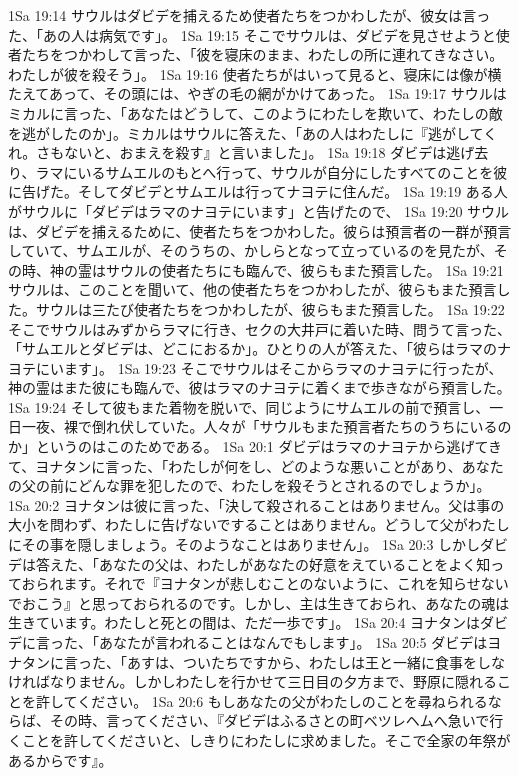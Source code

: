 1Sa 19:14  サウルはダビデを捕えるため使者たちをつかわしたが、彼女は言った、「あの人は病気です」。
1Sa 19:15  そこでサウルは、ダビデを見させようと使者たちをつかわして言った、「彼を寝床のまま、わたしの所に連れてきなさい。わたしが彼を殺そう」。
1Sa 19:16  使者たちがはいって見ると、寝床には像が横たえてあって、その頭には、やぎの毛の網がかけてあった。
1Sa 19:17  サウルはミカルに言った、「あなたはどうして、このようにわたしを欺いて、わたしの敵を逃がしたのか」。ミカルはサウルに答えた、「あの人はわたしに『逃がしてくれ。さもないと、おまえを殺す』と言いました」。
1Sa 19:18  ダビデは逃げ去り、ラマにいるサムエルのもとへ行って、サウルが自分にしたすべてのことを彼に告げた。そしてダビデとサムエルは行ってナヨテに住んだ。
1Sa 19:19  ある人がサウルに「ダビデはラマのナヨテにいます」と告げたので、
1Sa 19:20  サウルは、ダビデを捕えるために、使者たちをつかわした。彼らは預言者の一群が預言していて、サムエルが、そのうちの、かしらとなって立っているのを見たが、その時、神の霊はサウルの使者たちにも臨んで、彼らもまた預言した。
1Sa 19:21  サウルは、このことを聞いて、他の使者たちをつかわしたが、彼らもまた預言した。サウルは三たび使者たちをつかわしたが、彼らもまた預言した。
1Sa 19:22  そこでサウルはみずからラマに行き、セクの大井戸に着いた時、問うて言った、「サムエルとダビデは、どこにおるか」。ひとりの人が答えた、「彼らはラマのナヨテにいます」。
1Sa 19:23  そこでサウルはそこからラマのナヨテに行ったが、神の霊はまた彼にも臨んで、彼はラマのナヨテに着くまで歩きながら預言した。
1Sa 19:24  そして彼もまた着物を脱いで、同じようにサムエルの前で預言し、一日一夜、裸で倒れ伏していた。人々が「サウルもまた預言者たちのうちにいるのか」というのはこのためである。
1Sa 20:1  ダビデはラマのナヨテから逃げてきて、ヨナタンに言った、「わたしが何をし、どのような悪いことがあり、あなたの父の前にどんな罪を犯したので、わたしを殺そうとされるのでしょうか」。
1Sa 20:2  ヨナタンは彼に言った、「決して殺されることはありません。父は事の大小を問わず、わたしに告げないですることはありません。どうして父がわたしにその事を隠しましょう。そのようなことはありません」。
1Sa 20:3  しかしダビデは答えた、「あなたの父は、わたしがあなたの好意をえていることをよく知っておられます。それで『ヨナタンが悲しむことのないように、これを知らせないでおこう』と思っておられるのです。しかし、主は生きておられ、あなたの魂は生きています。わたしと死との間は、ただ一歩です」。
1Sa 20:4  ヨナタンはダビデに言った、「あなたが言われることはなんでもします」。
1Sa 20:5  ダビデはヨナタンに言った、「あすは、ついたちですから、わたしは王と一緒に食事をしなければなりません。しかしわたしを行かせて三日目の夕方まで、野原に隠れることを許してください。
1Sa 20:6  もしあなたの父がわたしのことを尋ねられるならば、その時、言ってください、『ダビデはふるさとの町ベツレヘムへ急いで行くことを許してくださいと、しきりにわたしに求めました。そこで全家の年祭があるからです』。
